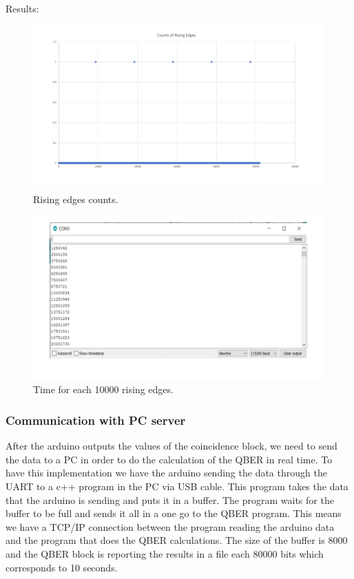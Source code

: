 \begin{refsection}
Results:
\begin{figure}[H]
	\centering
	\includegraphics[width=1\linewidth]{./sdf/arduino_quantum_rx/figures/Teste2.pdf}
	\caption{Rising edges counts.}
	\label{montage}
\end{figure}

\begin{figure}[H]
	\centering
	\includegraphics[width=1\linewidth]{./sdf/arduino_quantum_rx/figures/Teste1.pdf}
	\caption{Time for each 10000 rising edges.}
	\label{montage}
\end{figure}

	\subsubsection{Communication with PC server}
	After the arduino outputs the values of the coincidence block, we need to send the data to a PC in order to do the calculation of the QBER in real time. To have this implementation we have the arduino sending the data through the UART to a c++ program in the PC via USB cable. This program takes the data that the arduino is sending and puts it in a buffer. The program waits for the buffer to be full and sends it all in a one go to the QBER program. This means we have a TCP/IP connection between the program reading the arduino data and the program that does the QBER calculations. The size of the buffer is 8000 and the QBER block is reporting the results in a file each 80000 bits which corresponds to 10 seconds.
	

\end{refsection}
